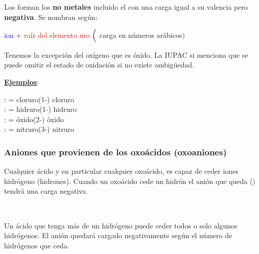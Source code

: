 \documentclass[11pt, a4paper]{article}
\begin{document}
Los forman los \textbf{no metales} incluido el  con una carga igual a su valencia pero \textbf{negativa}. Se nombran según:

\begin{center}
    \textcolor{blue}{ion} + \textcolor{red}{raíz del elemento} \textcolor{red}{uro} $\Bigl($ \textcolor{mygreen}{carga en números arábicos}$\Bigr)$
\end{center}

Tenemos la excepción del oxígeno que es óxido. La IUPAC si menciona que se puede omitir el estado de oxidación si no existe ambigüedad.

\textbf{\uline{Ejemplos}}:

\noindent {} :  = cloruro(1-) \ch{->} cloruro\\
 :  = hidruro(1-)\ch{->} hidruro\\
 :  = óxido(2-) \ch{->} óxido\\
 :  = nitruro(3-) \ch{->} nitruro

\subsubsection{Aniones que provienen de los oxoácidos (oxoaniones)}


Cualquier ácido y en particular cualquier oxoácido, es capaz de ceder iones hidrógeno (hidrones). Cuando un oxoácido cede un hidrón el anión que queda () tendrá una carga negativa.
\begin{center}
    \\
\end{center}

Un ácido que tenga más de un hidrógeno puede ceder todos o solo algunos hidrógenos. El anión quedará cargado negativamente según el número de hidrógenos que ceda.

\begin{center}
    \\
    \\
    \\
    \\
    \\
\end{center}
\end{document}
